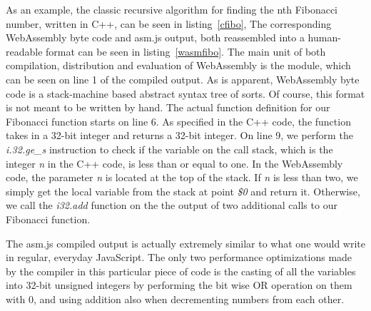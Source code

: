 \documentclass[conference]{IEEEtran}
\begin{document}
As an example, the classic recursive algorithm for finding the nth Fibonacci
number, written in C++, can be seen in listing~\ref{cfibo}, The corresponding
WebAssembly byte code and asm.js output, both reassembled into a human-readable
format can be seen in listing~\ref{wasmfibo}. The main unit of both
compilation, distribution and evaluation of WebAssembly is the module, which
can be seen on line 1 of the compiled output. As is apparent, WebAssembly
byte code is a stack-machine based abstract syntax tree of sorts. Of course,
this format is not meant to be written by hand. The actual function definition
for our Fibonacci function starts on line 6. As specified in the C++ code,
the function takes in a 32-bit integer and returns a 32-bit integer. On line 9,
we perform the \emph{i.32.ge\_s} instruction to check if the variable on the
call stack, which is the integer \emph{n} in the C++ code, is less than or
equal to one. In the WebAssembly code, the parameter \emph{n} is located at the
top of the stack. If \emph{n} is less than two, we simply get the local
variable from the stack at point \emph{\$0} and return it. Otherwise, we call
the \emph{i32.add} function on the the output of two additional calls to our
Fibonacci function.

The asm.js compiled output is actually extremely similar to what one would
write in regular, everyday JavaScript. The only two performance optimizations
made by the compiler in this particular piece of code is the casting of all the
variables into 32-bit unsigned integers by performing the bit wise OR operation
on them with 0, and using addition also when decrementing numbers from each
other.
\end{document}
